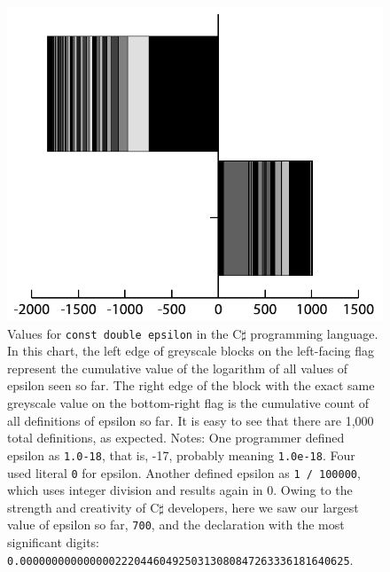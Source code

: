 \documentclass[twocolumn]{article}
\begin{document}
\begin{figure}[ht]
\begin{center}
\includegraphics[width=0.99 \linewidth]{chart-csharp}
\end{center}\vspace{-0.1in}
\caption{ Values for {\tt const double epsilon} in the C$\sharp$
  programming language. In this chart, the left edge of greyscale
  blocks on the left-facing flag represent the cumulative value of the
  logarithm of all values of epsilon seen so far. The right edge of
  the block with the exact same greyscale value on the bottom-right
  flag is the cumulative count of all definitions of epsilon so far.
  It is easy to see that there are 1,000 total definitions, as
  expected.
  Notes: One programmer defined epsilon as {\tt 1.0-18}, that is,
  -17, probably meaning {\tt 1.0e-18}. Four used literal {\tt 0} for
  epsilon. Another defined epsilon as {\tt 1 / 100000}, which uses
  integer division and results again in 0. Owing to the strength and
  creativity of C$\sharp$ developers, here we saw our largest
  value of epsilon so far, {\tt 700}, and the declaration with the most
  significant digits: {\tt
    0.0000000000000002220446049250313080847263336181640625}.
}
\label{fig:csharp}
\end{figure}
\end{document}
